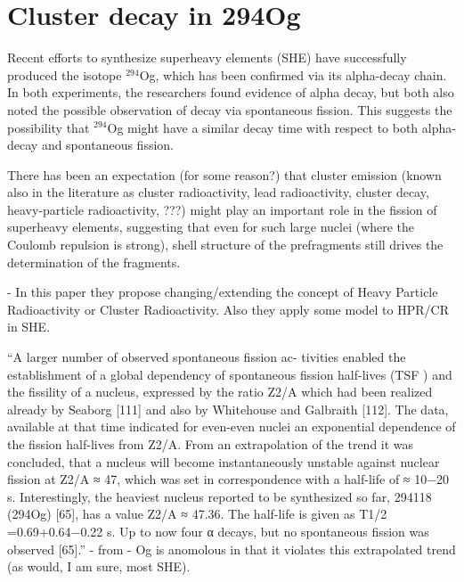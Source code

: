 \chapter{Cluster decay in 294Og}\label{chap:294Og}

\maketitle

Recent efforts to synthesize superheavy elements (SHE) have successfully produced the isotope $^{294}$Og, which has been confirmed via its alpha-decay chain. In both experiments, the researchers found evidence of alpha decay, but both also noted the possible observation of decay via spontaneous fission. This suggests the possibility that $^{294}$Og might have a similar decay time with respect to both alpha-decay and spontaneous fission.

There has been an expectation (for some reason?) that cluster emission (known also in the literature as cluster radioactivity, lead radioactivity, cluster decay, heavy-particle radioactivity, ???) might play an important role in the fission of superheavy elements, suggesting that even for such large nuclei (where the Coulomb repulsion is strong), shell structure of the prefragments still drives the determination of the fragments.

\cite{Poenaru2011, Poenaru2012} - In this paper they propose changing/extending the concept of Heavy Particle Radioactivity or Cluster Radioactivity. Also they apply some model to HPR/CR in SHE.

``A larger number of observed spontaneous fission ac- tivities enabled the establishment of a global dependency of spontaneous fission half-lives (TSF ) and the fissility of a nucleus, expressed by the ratio Z2/A which had been realized already by Seaborg [111] and also by Whitehouse and Galbraith [112]. The data, available at that time indicated for even-even nuclei an exponential dependence of the fission half-lives from Z2/A. From an extrapolation of the trend it was concluded, that a nucleus will become instantaneously unstable against nuclear fission at Z2/A ≈ 47, which was set in correspondence with a half-life of ≈ 10−20 s. Interestingly, the heaviest nucleus reported to be synthesized so far, 294118 (294Og) [65], has a value Z2/A ≈ 47.36. The half-life is given as T1/2 =0.69+0.64−0.22 s. Up to now four α decays, but no spontaneous fission was observed [65].'' - from \cite{Heßberger2017} - Og is anomolous in that it violates this extrapolated trend (as would, I am sure, most SHE).

